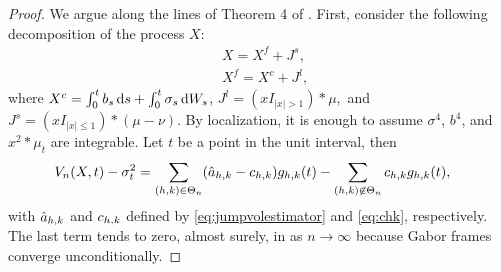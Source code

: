 \begin{proof}
  \begin{comment}  We wish to show that the random variable
  $\int_0^1 (\jvn - \sigma^2(t))^2\D t$ tends to zero in probability. The regularity conditions on $X$ and $\sigma^2$ imply that  $\sup_{t \in [0,1]} (\jvn - \sigma^2(t))^2$ is a random variable and that the previous claim would follow as soon as $\sup_{t \in [0,1]} (\jvn - \sigma^2(t))^2$ is shown  to converge to  zero in probability.\end{comment}
  We argue along the lines of Theorem 4 of  \cite{Mancini2009}. First,  consider the following decomposition of the process $X$:
  \begin{align}
    &X = X^f + J^s\label{eq:xj},\\
    &X^f = X^c + J^l\label{eq:xjc},
  \end{align}
  where 
    $X^c = \int^t_0 b_s \D s + \int^t_0 \sigma_s \D W_s$, 
    $J^l = (xI_{\vert x \vert > 1}) \ast \mu,$
    and $J^s = (xI_{\vert x \vert \le  1} )\ast (\mu - \nu)$. By localization, it is enough to assume $\sigma^4$, $b^4$, and $x^2 \ast \mu_t$  are integrable. 
    Let $t$ be a point in the unit interval, then 
    \begin{align}
      \jvn -  \sigma^2_t &= \sumt (\ceen{X} - \cee) \ghk(t) - \sumnt \cee \ghk(t),
      \label{eq:open}
    \end{align}
    with $\ceen{X}$ and $\cee$ defined by \eqref{eq:jumpvolestimator} and \eqref{eq:chk}, respectively. The last term tends to zero, almost surely, in \Ltwo as $n \to \infty$ because Gabor frames converge unconditionally. 
    

\end{proof}
